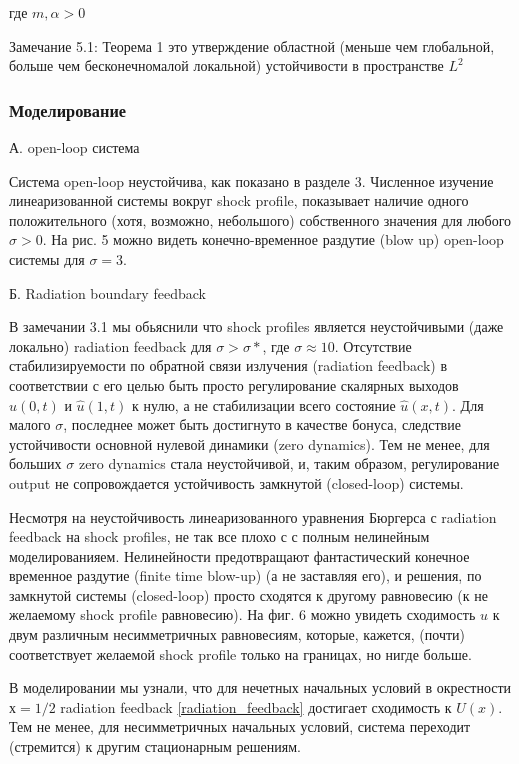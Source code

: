 где $m, \alpha > 0$

Замечание 5.1: Теорема 1 это утверждение областной (меньше чем глобальной, больше чем бесконечномалой локальной) устойчивости в пространстве $L^2$

\subsubsection{Моделирование}

А. open-loop система

Система open-loop неустойчива, как показано в разделе 3. Численное изучение линеаризованной системы вокруг shock profile, показывает наличие одного положительного (хотя, возможно, небольшого) собственного значения для любого $\sigma > 0$. На рис. 5 можно видеть конечно-временное раздутие (blow up) open-loop системы для $\sigma = 3$.

Б. Radiation boundary feedback

В замечании 3.1 мы обьяснили что shock profiles является неустойчивыми (даже локально) radiation feedback для $\sigma > \sigma*$, где $\sigma \approx 10$. Отсутствие стабилизируемости по обратной связи излучения (radiation feedback) в соответствии с его целью быть просто регулирование скалярных выходов $\hat{u}(0, t)$ и $\hat{u}(1, t)$ к нулю, а не стабилизации всего состояние $\hat{u}(x, t)$. Для малого $\sigma$, последнее может быть достигнуто в качестве бонуса, следствие устойчивости основной нулевой динамики (zero dynamics). Тем не менее, для больших $\sigma$ zero dynamics стала неустойчивой, и, таким образом, регулирование output не сопровождается устойчивость замкнутой (closed-loop) системы.

Несмотря на неустойчивость линеаризованного уравнения Бюргерса с radiation feedback на shock profiles, не так все плохо с с полным нелинейным моделированияем. Нелинейности предотвращают фантастический конечное временное раздутие (finite time blow-up) (а не заставляя его), и решения, по замкнутой системы (closed-loop) просто сходятся к другому равновесию (к не желаемому shock profile равновесию). На фиг. 6 можно увидеть сходимость $u$ к двум различным несимметричных равновесиям, которые, кажется, (почти) соответствует желаемой shock profile только на границах, но нигде больше.

В моделировании мы узнали, что для нечетных начальных условий в окрестности $х = 1/2$ radiation feedback \eqref{radiation_feedback} достигает сходимость к $U(x)$. Тем не менее, для несимметричных начальных условий, система переходит (стремится) к другим стационарным решениям.

